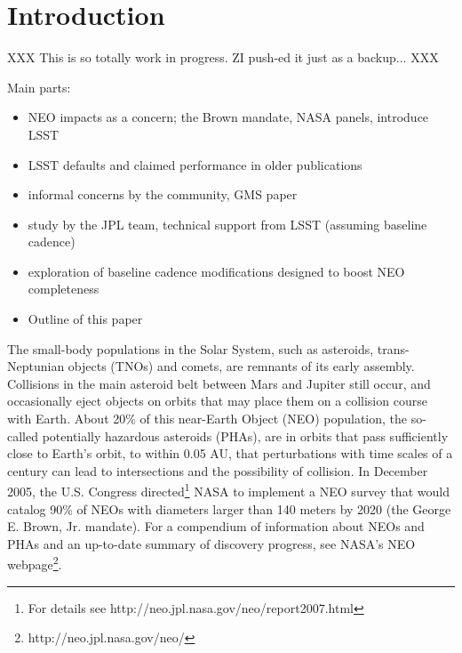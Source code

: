 
\section{Introduction}

XXX This is so totally work in progress. ZI push-ed it just as a backup... XXX

Main parts:
\begin{itemize}
\item NEO impacts as a concern; the Brown mandate, NASA panels, introduce LSST 
\item LSST defaults and claimed performance in older publications
\item informal concerns by the community, GMS paper
\item study by the JPL team, technical support from LSST (assuming baseline cadence)
\item exploration of baseline cadence modifications designed to boost NEO completeness 
\item Outline of this paper
\end{itemize} 



The small-body populations in the Solar System, such as asteroids, trans-Neptunian objects (TNOs) 
and comets, are remnants of its early assembly. Collisions in the main asteroid belt between Mars and 
Jupiter still occur, and occasionally eject objects on orbits that may place them on a collision course 
with Earth. About 20\% of this near-Earth Object (NEO) population, the so-called potentially hazardous 
asteroids (PHAs), are in orbits that pass sufficiently close to Earth's orbit, to within 0.05 AU, that 
perturbations with time scales of a century can lead to intersections and the possibility of collision. 
In December 2005, the U.S. Congress directed\footnote{For details see http://neo.jpl.nasa.gov/neo/report2007.html} 
NASA to implement a NEO survey that would catalog 90\% of NEOs with diameters larger than 140 meters 
by 2020 (the George E. Brown, Jr. mandate). For a compendium of information about NEOs and PHAs 
and an up-to-date summary of discovery progress, see NASA's NEO webpage\footnote{http://neo.jpl.nasa.gov/neo/}. 

